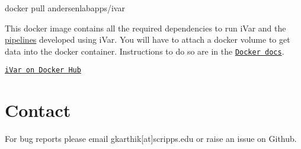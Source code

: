 \begin{DoxyCode}
docker pull andersenlabapps/ivar
\end{DoxyCode}


This docker image contains all the required dependencies to run i\+Var and the \mbox{\hyperlink{cookbookpage}{pipelines}} developed using i\+Var. You will have to attach a docker volume to get data into the docker container. Instructions to do so are in the \href{https://docs.docker.com/storage/volumes/}{\tt Docker docs}.

\href{https://hub.docker.com/r/andersenlabapps/ivar/}{\tt i\+Var on Docker Hub}\hypertarget{installpage_autotoc_md11}{}\section{Contact}\label{installpage_autotoc_md11}
For bug reports please email gkarthik\mbox{[}at\mbox{]}scripps.\+edu or raise an issue on Github. 